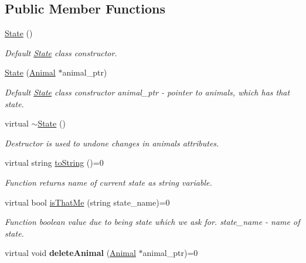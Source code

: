 \subsection*{Public Member Functions}
\begin{DoxyCompactItemize}
\item 
\hyperlink{class_state_ab91bb1dd5aa6260ab2a456581daf9ec2}{State} ()
\begin{DoxyCompactList}\small\item\em Default \hyperlink{class_state}{State} class constructor. \end{DoxyCompactList}\item 
\hyperlink{class_state_ada7fbeef8c2d2d745693ff78ae02f47f}{State} (\hyperlink{class_animal}{Animal} $\ast$animal\+\_\+ptr)
\begin{DoxyCompactList}\small\item\em Default \hyperlink{class_state}{State} class constructor  animal\+\_\+ptr -\/ pointer to animals, which has that state. \end{DoxyCompactList}\item 
virtual \hyperlink{class_state_a9ddc1df6f998184d6477b48fab90281c}{$\sim$\+State} ()
\begin{DoxyCompactList}\small\item\em Destructor is used to undone changes in animal\textquotesingle{}s attributes. \end{DoxyCompactList}\item 
virtual string \hyperlink{class_state_afabc279037b4526ec161e6f8988855a9}{to\+String} ()=0
\begin{DoxyCompactList}\small\item\em Function returns name of current state as string variable. \end{DoxyCompactList}\item 
virtual bool \hyperlink{class_state_a049e4e2c7902faf26c7ac5f24f18fccb}{is\+That\+Me} (string state\+\_\+name)=0
\begin{DoxyCompactList}\small\item\em Function boolean value due to being state which we ask for.  state\+\_\+name -\/ name of state. \end{DoxyCompactList}\item 
\hypertarget{class_state_ada2495a9b5e28528e60d876aeef554b4}{}virtual void {\bfseries delete\+Animal} (\hyperlink{class_animal}{Animal} $\ast$animal\+\_\+ptr)=0\label{class_state_ada2495a9b5e28528e60d876aeef554b4}

\end{DoxyCompactItemize}
